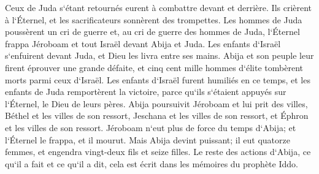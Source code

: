 \verse Ceux de Juda s`étant retournés eurent à combattre devant et derrière. Ils crièrent à l`Éternel, et les sacrificateurs sonnèrent des trompettes. 
\verse Les hommes de Juda poussèrent un cri de guerre et, au cri de guerre des hommes de Juda, l`Éternel frappa Jéroboam et tout Israël devant Abija et Juda. 
\verse Les enfants d`Israël s`enfuirent devant Juda, et Dieu les livra entre ses mains. 
\verse Abija et son peuple leur firent éprouver une grande défaite, et cinq cent mille hommes d`élite tombèrent morts parmi ceux d`Israël. 
\verse Les enfants d`Israël furent humiliés en ce temps, et les enfants de Juda remportèrent la victoire, parce qu`ils s`étaient appuyés sur l`Éternel, le Dieu de leurs pères. 
\verse Abija poursuivit Jéroboam et lui prit des villes, Béthel et les villes de son ressort, Jeschana et les villes de son ressort, et Éphron et les villes de son ressort. 
\verse Jéroboam n`eut plus de force du temps d`Abija; et l`Éternel le frappa, et il mourut. 
\verse Mais Abija devint puissant; il eut quatorze femmes, et engendra vingt-deux fils et seize filles. 
\verse Le reste des actions d`Abija, ce qu`il a fait et ce qu`il a dit, cela est écrit dans les mémoires du prophète Iddo. 

